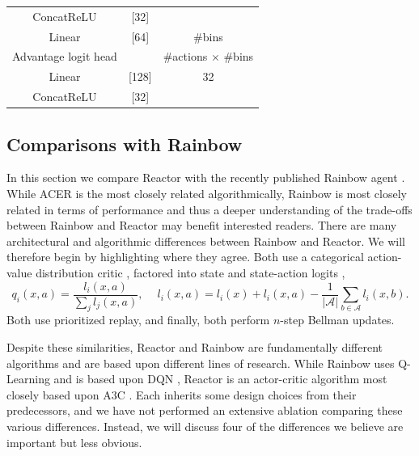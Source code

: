 \documentclass{article}
\begin{document}
\begin{table}[ht]
\begin{center}
\begin{sc}
\begin{tabular}{| c | c | c | c | c |}
ConcatReLU & [32] & \multicolumn{3}{|c|}{ }\\
Linear & [64] & \multicolumn{3}{|c|}{ \#bins }\\
\hline
Advantage logit head & & \multicolumn{3}{|c|}{ \#actions $\times$ \#bins} \\
\hline
Linear & [128] & \multicolumn{3}{|c|}{ 32 }\\
ConcatReLU & [32] & \multicolumn{3}{|c|}{ }\\
\hline
\end{tabular}
\end{sc}
\end{center}
\vskip -0.1in
\end{table}
\newpage
\subsection{Comparisons with Rainbow}
In this section we compare Reactor with the recently published Rainbow agent 
\citep{rainbow}. While ACER is the most closely related algorithmically, Rainbow 
is most closely related in terms of performance and thus a deeper understanding 
of the trade-offs between Rainbow and Reactor may benefit interested readers. 
There are many architectural and algorithmic differences between Rainbow and 
Reactor. We will therefore begin by highlighting where they agree. Both use a 
categorical action-value distribution critic 
\citep{bellemare2017distributional}, factored into state and state-action logits 
\citep{wang2015dueling},
\begin{equation*}
q_i(x, a) = \frac{l_i(x, a)}{\sum_j l_j(x, a)},\ \quad l_i(x, a) = l_i(x) + l_i(x, a) - \frac{1}{|\mathcal{A}|} \sum_{b \in \mathcal{A}} l_i(x, b).
\end{equation*}
Both use prioritized replay, and finally, both perform $n$-step Bellman updates.

Despite these similarities, Reactor and Rainbow are fundamentally different 
algorithms and are based upon different lines of research. While Rainbow uses 
Q-Learning and is based upon DQN \citep{mnih15human}, Reactor is an actor-critic 
algorithm most closely based upon A3C \citep{mnih2016asynchronous}. Each 
inherits some design choices from their predecessors, and we have not performed 
an extensive ablation comparing these various differences. Instead, we will 
discuss four of the differences we believe are important but less obvious.
\end{document}
